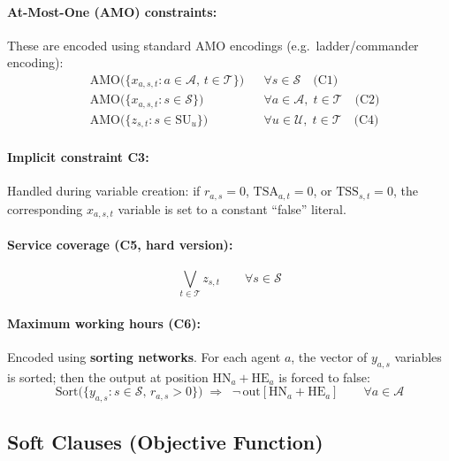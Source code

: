 \documentclass[11pt,a4paper]{article}
\newcommand{\setA}{\mathcal{A}}
\newcommand{\setU}{\mathcal{U}}
\newcommand{\setS}{\mathcal{S}}
\newcommand{\setT}{\mathcal{T}}
\newcommand{\SU}{\mathrm{SU}}
\newcommand{\TSA}{\mathrm{TSA}}
\newcommand{\TSS}{\mathrm{TSS}}
\newcommand{\HN}{\mathrm{HN}}
\newcommand{\HE}{\mathrm{HE}}
\begin{document}
\paragraph{At-Most-One (AMO) constraints:}
These are encoded using standard AMO encodings (e.g.\ ladder/commander encoding):
\begin{align}
    &\mathrm{AMO}\bigl(\{x_{a,s,t} : a \in \setA,\, t \in \setT\}\bigr)
    && \forall s \in \setS \quad \text{(C1)} \label{eq:amo1}\\
    &\mathrm{AMO}\bigl(\{x_{a,s,t} : s \in \setS\}\bigr)
    && \forall a \in \setA,\; t \in \setT \quad \text{(C2)} \label{eq:amo2}\\
    &\mathrm{AMO}\bigl(\{z_{s,t} : s \in \SU_u\}\bigr)
    && \forall u \in \setU,\; t \in \setT \quad \text{(C4)} \label{eq:amo4}
\end{align}

\paragraph{Implicit constraint C3:}
Handled during variable creation: if
$r_{a,s} = 0$, $\TSA_{a,t} = 0$, or $\TSS_{s,t} = 0$,
the corresponding $x_{a,s,t}$ variable is set to a constant ``false'' literal.

\paragraph{Service coverage (C5, hard version):}
\begin{equation}\label{eq:cov-hard}
    \bigvee_{t \in \setT} z_{s,t} \qquad \forall s \in \setS
\end{equation}

\paragraph{Maximum working hours (C6):}
Encoded using \textbf{sorting networks}.  For each agent $a$, the vector of
$y_{a,s}$ variables is sorted; then the output at position
$\HN_a + \HE_a$ is forced to false:
\begin{equation}\label{eq:max-hours}
    \mathrm{Sort}\bigl(\{y_{a,s} : s \in \setS,\, r_{a,s} > 0\}\bigr)
    \;\Longrightarrow\;\;
    \neg\, \mathrm{out}[\HN_a + \HE_a]
    \qquad \forall a \in \setA
\end{equation}

\subsection{Soft Clauses (Objective Function)}
\end{document}

